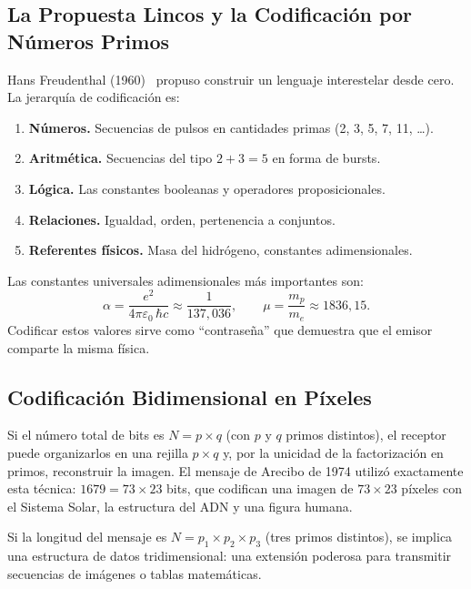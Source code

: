 \documentclass[12pt,a4paper]{article}
\begin{document}
\subsection{La Propuesta Lincos y la Codificación por Números Primos}

Hans Freudenthal (1960)~\citep{Freudenthal1960} propuso construir un lenguaje interestelar desde
cero. La jerarquía de codificación es:
\begin{enumerate}[noitemsep]
  \item \textbf{Números.} Secuencias de pulsos en cantidades primas (2, 3, 5, 7, 11, \ldots).
  \item \textbf{Aritmética.} Secuencias del tipo $2 + 3 = 5$ en forma de bursts.
  \item \textbf{Lógica.} Las constantes booleanas y operadores proposicionales.
  \item \textbf{Relaciones.} Igualdad, orden, pertenencia a conjuntos.
  \item \textbf{Referentes físicos.} Masa del hidrógeno, constantes adimensionales.
\end{enumerate}
Las constantes universales adimensionales más importantes son:
\begin{equation}
  \alpha = \frac{e^2}{4\pi\varepsilon_0\,\hbar c} \approx \frac{1}{137{,}036},
  \qquad
  \mu = \frac{m_p}{m_e} \approx 1836{,}15.
\end{equation}
Codificar estos valores sirve como ``contraseña'' que demuestra que el emisor
comparte la misma física.

\subsection{Codificación Bidimensional en Píxeles}

Si el número total de bits es $N = p \times q$ (con $p$ y $q$ primos
distintos), el receptor puede organizarlos en una rejilla $p \times q$ y, por
la unicidad de la factorización en primos, reconstruir la imagen. El mensaje de
Arecibo de 1974 utilizó exactamente esta técnica: $1679 = 73 \times 23$ bits,
que codifican una imagen de $73 \times 23$ píxeles con el Sistema Solar, la
estructura del ADN y una figura humana.

Si la longitud del mensaje es $N = p_1 \times p_2 \times p_3$ (tres primos
distintos), se implica una estructura de datos tridimensional: una extensión
poderosa para transmitir secuencias de imágenes o tablas matemáticas.

\end{document}
